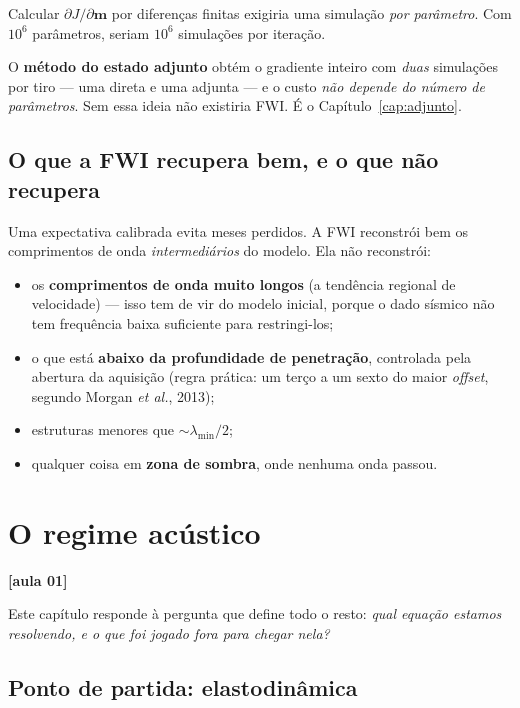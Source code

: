 \documentclass[11pt,a4paper,oneside]{report}
\newcommand{\aula}[1]{\textcolor{cianofwi}{\textbf{[aula #1]}}}
\begin{document}
\begin{teoria}
Calcular $\partial J/\partial \mathbf{m}$ por diferenças finitas exigiria uma
simulação \emph{por parâmetro}. Com $10^6$ parâmetros, seriam $10^6$
simulações por iteração.

O \textbf{método do estado adjunto} obtém o gradiente inteiro com
\emph{duas} simulações por tiro --- uma direta e uma adjunta --- e o custo
\emph{não depende do número de parâmetros}. Sem essa ideia não existiria FWI.
É o Capítulo~\ref{cap:adjunto}.
\end{teoria}

\section{O que a FWI recupera bem, e o que não recupera}

Uma expectativa calibrada evita meses perdidos. A FWI reconstrói bem os
comprimentos de onda \emph{intermediários} do modelo. Ela não reconstrói:

\begin{itemize}[leftmargin=*]
\item os \textbf{comprimentos de onda muito longos} (a tendência regional de
velocidade) --- isso tem de vir do modelo inicial, porque o dado sísmico não
tem frequência baixa suficiente para restringi-los;
\item o que está \textbf{abaixo da profundidade de penetração}, controlada
pela abertura da aquisição (regra prática: um terço a um sexto do maior
\emph{offset}, segundo Morgan \emph{et al.}, 2013);
\item estruturas menores que $\sim\lambda_{\min}/2$;
\item qualquer coisa em \textbf{zona de sombra}, onde nenhuma onda passou.
\end{itemize}

\chapter{O regime acústico}
\label{cap:acustico}

\aula{01}

Este capítulo responde à pergunta que define todo o resto: \emph{qual equação
estamos resolvendo, e o que foi jogado fora para chegar nela?}

\section{Ponto de partida: elastodinâmica}
\end{document}
